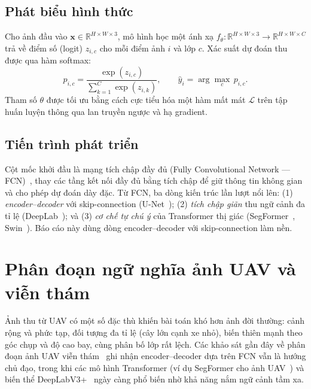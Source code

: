 \subsection{Phát biểu hình thức}
Cho ảnh đầu vào $\mathbf{x}\in\mathbb{R}^{H\times W\times 3}$, mô hình học một ánh xạ
$f_\theta:\mathbb{R}^{H\times W\times 3}\rightarrow \mathbb{R}^{H\times W\times C}$ trả
về điểm số (logit) $z_{i,c}$ cho mỗi điểm ảnh $i$ và lớp $c$. Xác suất dự đoán thu
được qua hàm softmax:
\begin{equation}
p_{i,c} = \frac{\exp(z_{i,c})}{\sum_{k=1}^{C}\exp(z_{i,k})},
\qquad \hat{y}_i = \arg\max_c\, p_{i,c}.
\end{equation}
Tham số $\theta$ được tối ưu bằng cách cực tiểu hóa một hàm mất mát $\mathcal{L}$ trên
tập huấn luyện thông qua lan truyền ngược và hạ gradient.

\subsection{Tiến trình phát triển}
Cột mốc khởi đầu là mạng tích chập đầy đủ (Fully Convolutional Network ---
FCN)~\cite{long2015fcn}, thay các tầng kết nối đầy đủ bằng tích chập để giữ thông tin
không gian và cho phép dự đoán dày đặc. Từ FCN, ba dòng kiến trúc lần lượt nổi lên:
(1) \emph{encoder--decoder} với skip-connection (U-Net~\cite{ronneberger2015unet});
(2) \emph{tích chập giãn} thu ngữ cảnh đa tỉ lệ (DeepLab~\cite{chen2018deeplabv3plus});
và (3) \emph{cơ chế tự chú ý} của Transformer thị giác
(SegFormer~\cite{xie2021segformer}, Swin~\cite{liu2021swin}). Báo cáo này dùng dòng
encoder--decoder với skip-connection làm nền.

\section{Phân đoạn ngữ nghĩa ảnh UAV và viễn thám}

Ảnh thu từ UAV có một số đặc thù khiến bài toán khó hơn ảnh đời thường: cảnh rộng và
phức tạp, đối tượng đa tỉ lệ (cây lớn cạnh xe nhỏ), biến thiên mạnh theo góc chụp và
độ cao bay, cùng phân bố lớp rất lệch. Các khảo sát gần đây về phân đoạn ảnh UAV viễn
thám~\cite{uavreview2024} ghi nhận encoder--decoder dựa trên FCN vẫn là hướng chủ đạo,
trong khi các mô hình Transformer (ví dụ SegFormer cho ảnh UAV~\cite{xie2021segformer})
và biến thể DeepLabV3+~\cite{chen2018deeplabv3plus} ngày càng phổ biến nhờ khả năng
nắm ngữ cảnh tầm xa.

